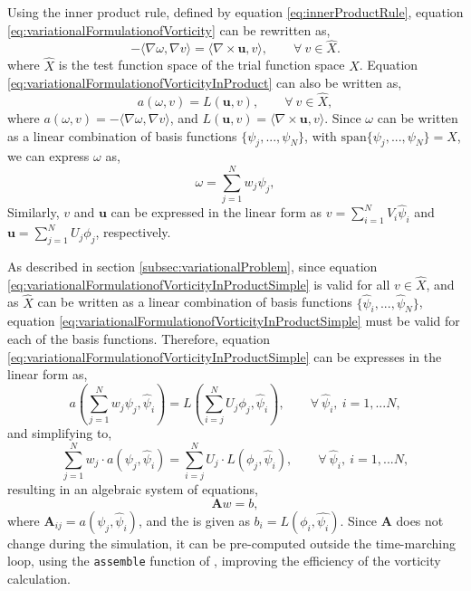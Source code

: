Using the inner product rule, defined by equation \ref{eq:innerProductRule}, equation \ref{eq:variationalFormulationofVorticity} can be rewritten as,
	\begin{equation}
	-\langle \nabla \omega,\nabla v \rangle = \langle \nabla \times \mathbf{u},v \rangle, \qquad \forall\ v \in \hat{X}.
	\label{eq:variationalFormulationofVorticityInProduct}
	\end{equation}
where $\hat{X}$ is the test function space of the trial function space $X$. Equation 	\ref{eq:variationalFormulationofVorticityInProduct} can also be written as, 
		\begin{equation}
		a(\omega,v) = L(\mathbf{u},v), \qquad \forall\ v \in \hat{X},
		\label{eq:variationalFormulationofVorticityInProductSimple}
		\end{equation}
where $a(\omega,v) = -\langle \nabla \omega,\nabla v \rangle$, and $L(\mathbf{u},v) =  \langle \nabla \times \mathbf{u},v \rangle$. Since $\omega$ can be written as a linear combination of basis functions $\{\psi_j,...,\psi_N\}$, with $\mathrm{span}\{\psi_j,...,\psi_N\} = X$, we can express $\omega$ as,
		\begin{equation}
		\omega = \sum_{j=1}^N w_j\psi_j,
		\label{eq:vorticityLinear}
		\end{equation}
Similarly, $v$ and $\mathbf{u}$ can be expressed in the linear form as $v = \sum_{i=1}^N V_i \hat{\psi}_i$ and $\mathbf{u} = \sum_{j=1}^N U_j \phi_j$, respectively. 

As described in section \ref{subsec:variationalProblem}, since equation \ref{eq:variationalFormulationofVorticityInProductSimple} is valid for all $v \in \hat{X}$, and as $\hat{X}$ can be written as a linear combination of basis functions $\{\hat{\psi}_i,...,\hat{\psi}_N\}$, equation \ref{eq:variationalFormulationofVorticityInProductSimple} must be valid for each of the basis functions.  Therefore, equation \ref{eq:variationalFormulationofVorticityInProductSimple} can be expresses in the linear form as, 
		\begin{equation}
		a(\sum_{j=1}^N w_j\psi_j,\hat{\psi}_i) = L(\sum_{i=j}^N U_j \phi_j,\hat{\psi}_i), \qquad \forall\ \hat{\psi}_i,\ i=1,...N,
		\label{eq:variationalFormulationofVorticityInProductSimpleLinear}
		\end{equation}
and simplifying to,
		\begin{equation}
		\sum_{j=1}^N w_j\cdot{a}(\psi_j,\hat{\psi}_i) = \sum_{i=j}^N U_j\cdot{L}(\phi_j,\hat{\psi}_i), \qquad \forall\ \hat{\psi}_i,\ i=1,...N,
		\label{eq:variationalFormulationofVorticityInProductSimpleLinearSum}
		\end{equation}
resulting in an algebraic system of equations,
		\begin{equation}
		\mathbf{A}w = b,
		\label{eq:variationalFormulationofVorticityInProductSimpleLinearSumSoE}
		\end{equation}
where $\mathbf{A}_{ij} = a(\psi_j, \hat{\psi}_i)$, and the  is given as $b_i = L(\phi_i, \hat{\psi_i})$. Since $\mathbf{A}$ does not change during the simulation, it can be pre-computed outside the time-marching loop, using the \texttt{assemble} function of \dolfin, improving the efficiency of the vorticity calculation.

